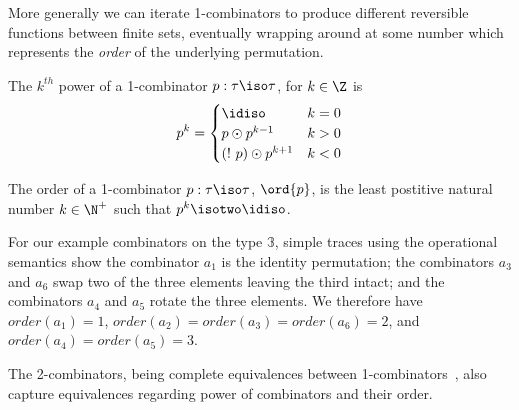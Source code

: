 More generally we can iterate 1-combinators to produce different
reversible functions between finite sets, eventually wrapping around
at some number which represents the \emph{order} of the underlying
permutation. 

\begin{definition}
  The $k^{th}$ power of a 1-combinator $p : \tau \iso \tau$, for
  $k \in \Z$ is
  \[
    p^k =
  \begin{cases}
    \idiso & k = 0 \\
    p \odot p^{k - 1} & k > 0 \\
    (!~p) \odot p^{k + 1} & k < 0 \\
  \end{cases}
  \]
\end{definition}

\begin{definition}
  The order of a 1-combinator $p : \tau \iso \tau$, $\ord{p}$, is the
  least postitive natural number $k \in \N^+$ such that
  $p^k \isotwo \idiso$.
\end{definition}

For our example combinators on the type $\mathbb{3}$, simple traces
using the operational semantics show the combinator $a_1$ is the
identity permutation; the combinators $a_3$ and $a_6$ swap two of the
three elements leaving the third intact; and the combinators $a_4$ and
$a_5$ rotate the three elements. We therefore have
$\mathit{order}(a_1)=1$,
$\mathit{order}(a_2)=\mathit{order}(a_3)=\mathit{order}(a_6)=2$, and
$\mathit{order}(a_4)=\mathit{order}(a_5)=3$. 



The 2-combinators, being complete equivalences between
1-combinators~\cite{Carette2016}, also capture equivalences regarding
power of combinators and their order. 


